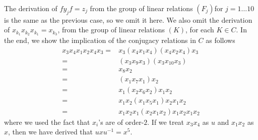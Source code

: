 The derivation of $fy_jf=z_j$ from the group of linear relations $(F_j)$for $j = 1 \dots 10$
is the same as the previous case, so we omit it here.
We also omit the derivation of $x_{k_1} x_{k_2} x_{k_1} = x_{k_3}$, 
from the group of linear relations $(K)$,
for each $K \in C$.
In the end, we show the implication of the conjugacy relations in $C$ as follows 
\begin{align*}
	x_3 x_4 x_1x_2 x_4 x_3 =& x_3 (x_4 x_1x_4) (x_4x_2 x_4) x_3 \\
	=& (x_3 x_9 x_3) (x_3 x_{10} x_3)\\
	=& x_8 x_2\\
	=& (x_1x_7x_1) x_2\\
	=&x_1(x_2 x_6 x_2)x_1x_2\\
	=& x_1x_2(x_1x_5x_1)x_2x_1x_2\\
	=&x_1x_2x_1(x_2x_1x_2)x_1x_2x_1x_2
\end{align*}
where we used the fact that $x_i$'s are of order-$2$.
If we treat $x_3x_4$ as $u$ and $x_1x_2$ as $x$, then we have derived that $uxu^{-1} = x^5$.

